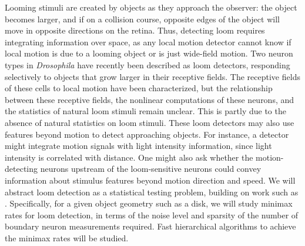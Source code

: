 Looming stimuli are created by objects as they approach the observer:
the object becomes larger, and if on a collision course,
opposite edges of the object will move in opposite directions on the
retina. Thus, detecting loom requires integrating information over
space, as any local motion detector cannot know if local motion is due
to a looming object or is just wide-field motion. Two neuron types in
\textit{Drosophila} have recently been described as loom detectors,
responding selectively to objects that grow larger in their receptive
fields. The receptive fields of these cells to local motion have been
characterized, but the relationship between these receptive fields,
the nonlinear computations of these neurons, and the statistics of
natural loom stimuli remain unclear. This is partly due to the
absence of natural statistics on loom stimuli. These loom detectors 
may also use features beyond motion to
detect approaching objects. For instance, a detector might integrate
motion signals with light intensity information, since light intensity
is correlated with distance. One might also ask whether the
motion-detecting neurons upstream of the loom-sensitive neurons could
convey information about stimulus features beyond motion
direction and speed. We will abstract loom detection as a statistical
testing problem, building on work such
as \citep{castro:05}.%
Specifically, for a given object
geometry such as a disk, we will study minimax rates for loom
detection, in terms of the noise level and sparsity of the number of
boundary neuron measurements required. Fast hierarchical algorithms
to achieve the minimax rates will be studied.



